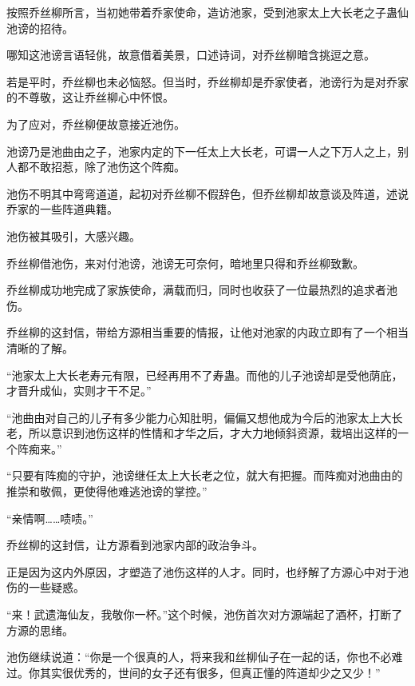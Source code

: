 \begin{this_body}
按照乔丝柳所言，当初她带着乔家使命，造访池家，受到池家太上大长老之子蛊仙池谤的招待。

哪知这池谤言语轻佻，故意借着美景，口述诗词，对乔丝柳暗含挑逗之意。

若是平时，乔丝柳也未必恼怒。但当时，乔丝柳却是乔家使者，池谤行为是对乔家的不尊敬，这让乔丝柳心中怀恨。

为了应对，乔丝柳便故意接近池伤。

池谤乃是池曲由之子，池家内定的下一任太上大长老，可谓一人之下万人之上，别人都不敢招惹，除了池伤这个阵痴。

池伤不明其中弯弯道道，起初对乔丝柳不假辞色，但乔丝柳却故意谈及阵道，述说乔家的一些阵道典籍。

池伤被其吸引，大感兴趣。

乔丝柳借池伤，来对付池谤，池谤无可奈何，暗地里只得和乔丝柳致歉。

乔丝柳成功地完成了家族使命，满载而归，同时也收获了一位最热烈的追求者池伤。

乔丝柳的这封信，带给方源相当重要的情报，让他对池家的内政立即有了一个相当清晰的了解。

“池家太上大长老寿元有限，已经再用不了寿蛊。而他的儿子池谤却是受他荫庇，才晋升成仙，实则才干不足。”

“池曲由对自己的儿子有多少能力心知肚明，偏偏又想他成为今后的池家太上大长老，所以意识到池伤这样的性情和才华之后，才大力地倾斜资源，栽培出这样的一个阵痴来。”

“只要有阵痴的守护，池谤继任太上大长老之位，就大有把握。而阵痴对池曲由的推崇和敬佩，更使得他难逃池谤的掌控。”

“亲情啊……啧啧。”

乔丝柳的这封信，让方源看到池家内部的政治争斗。

正是因为这内外原因，才塑造了池伤这样的人才。同时，也纾解了方源心中对于池伤的一些疑惑。

“来！武遗海仙友，我敬你一杯。”这个时候，池伤首次对方源端起了酒杯，打断了方源的思绪。

池伤继续说道：“你是一个很真的人，将来我和丝柳仙子在一起的话，你也不必难过。你其实很优秀的，世间的女子还有很多，但真正懂的阵道却少之又少！”

\end{this_body}


